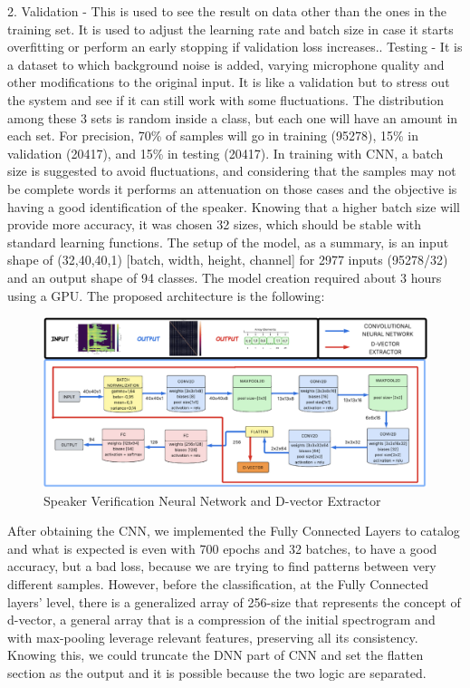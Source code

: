 2. Validation - This is used to see the result on data other than the ones in the training set. It is used to adjust the learning rate and batch size in case it starts overfitting or perform an early stopping if validation loss increases.. Testing - It is a dataset to which background noise is added, varying microphone quality and other modifications to the original input. It is like a validation but to stress out the system and see if it can still work with some fluctuations.\newline\newline
The distribution among these 3 sets is random inside a class, but each one will have an amount in each set. For precision, 70\% of samples will go in training (95278), 15\% in validation (20417), and 15\% in testing (20417). In training with CNN, a batch size is suggested to avoid fluctuations, and considering that the samples may not be complete words it performs an attenuation on those cases and the objective is having a good identification of the speaker. Knowing that a higher batch size will provide more accuracy, it was chosen 32 sizes, which should be stable with standard learning functions. The setup of the model, as a summary, is an input shape of (32,40,40,1) [batch, width, height, channel] for 2977 inputs (95278/32) and an output shape of 94 classes. The model creation required about 3 hours using a GPU. The proposed architecture is the following\cite{dvector_extractor_TinySV}:
\begin{center}
    \begin{figure}[!h]
        \centering
        \includegraphics[width=1.0\textwidth]{images/3.02 D-vector Extractor.png}
        \caption{Speaker Verification Neural Network and D-vector Extractor}
    \end{figure}
\end{center}
After obtaining the CNN, we implemented the Fully Connected Layers to catalog and what is expected is even with 700 epochs and 32 batches, to have a good accuracy, but a bad loss, because we are trying to find patterns between very different samples. However, before the classification, at the Fully Connected layers' level, there is a generalized array of 256-size that represents the concept of d-vector, a general array that is a compression of the initial spectrogram and with max-pooling leverage relevant features, preserving all its consistency. Knowing this, we could truncate the DNN part of CNN and set the flatten section as the output and it is possible because the two logic are separated.\newline
